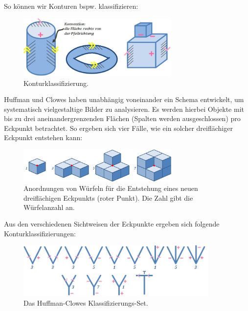 \begin{itemize}
So können wir Konturen bspw. klassifizieren:
\begin{figure}[h]
\centering
\includegraphics[width=8cm]{chapters/computervision/grafik_8_kontur.jpg}
\caption{Konturklassifizierung.}
\label{fig:8}
\end{figure}

Huffman und Clowes haben unabhängig voneinander ein Schema entwickelt, um systematisch vielgestaltige Bilder zu analysieren. Es werden hierbei Objekte mit bis zu drei aneinandergrenzenden Flächen (Spalten werden ausgeschlossen) pro Eckpunkt betrachtet.
So ergeben sich vier Fälle, wie ein solcher dreiflächiger Eckpunkt entstehen kann:
\begin{figure}[h]
\centering
\includegraphics[width=8cm]{chapters/computervision/grafik_9_de.jpg}
\caption{Anordnungen von Würfeln für die Entstehung eines neuen dreiflächigen Eckpunkts (roter Punkt). Die Zahl gibt die Würfelanzahl an.}
\label{fig:9}
\end{figure}

Aus den verschiedenen Sichtweisen der Eckpunkte ergeben sich folgende Konturklassifizierungen:
\begin{figure}[h]
\centering
\includegraphics[width=10cm]{chapters/computervision/grafik_10_label.jpg}
\caption{Das Huffman-Clowes Klassifizierungs-Set.}
\label{fig:10}
\end{figure}
\end{itemize}
